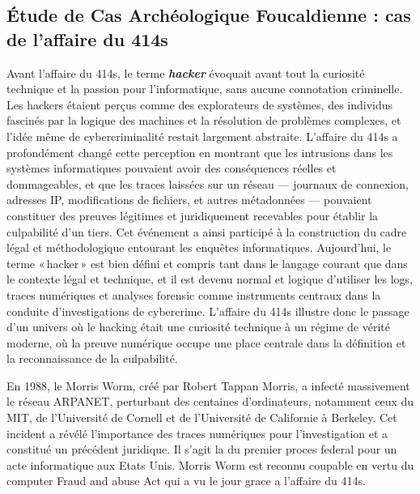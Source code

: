\documentclass[11pt,a4paper]{article}
\begin{document}
\subsection{Étude de Cas Archéologique Foucaldienne : cas de l'affaire du 414s}

Avant l’affaire du 414s, le terme \textbf{\textit{hacker}} évoquait avant tout la curiosité technique et la passion pour l’informatique, sans aucune connotation criminelle. Les hackers étaient perçus comme des explorateurs de systèmes, des individus fascinés par la logique des machines et la résolution de problèmes complexes, et l’idée même de cybercriminalité restait largement abstraite. L’affaire du 414s a profondément changé cette perception en montrant que les intrusions dans les systèmes informatiques pouvaient avoir des conséquences réelles et dommageables, et que les traces laissées sur un réseau — journaux de connexion, adresses IP, modifications de fichiers, et autres métadonnées — pouvaient constituer des preuves légitimes et juridiquement recevables pour établir la culpabilité d’un tiers. Cet événement a ainsi participé à la construction du cadre légal et méthodologique entourant les enquêtes informatiques. Aujourd’hui, le terme « hacker » est bien défini et compris tant dans le langage courant que dans le contexte légal et technique, et il est devenu normal et logique d’utiliser les logs, traces numériques et analyses forensic comme instruments centraux dans la conduite d’investigations de cybercrime. L’affaire du 414s illustre donc le passage d’un univers où le hacking était une curiosité technique à un régime de vérité moderne, où la preuve numérique occupe une place centrale dans la définition et la reconnaissance de la culpabilité.

En 1988, le Morris Worm, créé par Robert Tappan Morris, a infecté massivement le réseau ARPANET, perturbant des centaines d’ordinateurs, notamment ceux du MIT, de l’Université de Cornell et de l’Université de Californie à Berkeley. Cet incident a révélé l’importance des traces numériques pour l’investigation et a constitué un précédent juridique. Il s'agit la du premier proces federal pour un acte informatique aux Etats Unis. Morris Worm est reconnu coupable en vertu du computer Fraud and abuse Act  qui a vu le jour grace a l'affaire du 414s.
\end{document}
